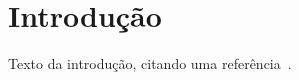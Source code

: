 \section{Introdução}
\label{sec:introducao}

Texto da introdução, citando uma referência~\cite{knuth1984}.
